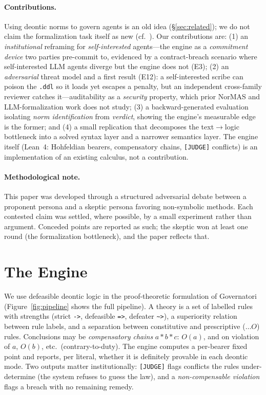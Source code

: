 \documentclass[11pt]{article}
\begin{document}
\paragraph{Contributions.}
Using deontic norms to govern agents is an old idea (\S\ref{sec:related}); we do not claim the
formalization task itself as new (cf.\ \citet{horner2025robust}). Our contributions are:
(1) an \emph{institutional} reframing for \emph{self-interested} agents---the engine as a
\emph{commitment device} two parties pre-commit to, evidenced by a contract-breach scenario where
self-interested LLM agents diverge but the engine does not (E3); (2) an \emph{adversarial}
threat model and a first result (E12): a self-interested scribe can poison the \texttt{.ddl} so it
loads yet escapes a penalty, but an independent cross-family reviewer catches it---auditability as
a \emph{security} property, which prior NorMAS and LLM-formalization work does not study;
(3) a backward-generated evaluation isolating \emph{norm identification} from \emph{verdict},
showing the engine's measurable edge is the former; and (4) a small replication that decomposes the
text$\rightarrow$logic bottleneck into a solved syntax layer and a narrower semantics layer.
The engine itself (Lean~4: Hohfeldian bearers, compensatory chains, \texttt{[JUDGE]} conflicts)
is an implementation of an existing calculus, not a contribution.

\paragraph{Methodological note.}
This paper was developed through a structured adversarial debate between a
proponent persona and a skeptic persona favoring non-symbolic methods. Each
contested claim was settled, where possible, by a small experiment rather than
argument. Conceded points are reported as such; the skeptic won at least one round
(the formalization bottleneck), and the paper reflects that.

\section{The Engine}
We use defeasible deontic logic in the proof-theoretic formulation of Governatori
(Figure~\ref{fig:pipeline} shows the full pipeline).
A theory is a set of labelled rules with strengths (strict \texttt{->}, defeasible
\texttt{=>}, defeater \texttt{\textasciitilde>}), a superiority relation between
rule labels, and a separation between constitutive and prescriptive ($\dots O$)
rules. Conclusions may be \emph{compensatory chains} $a * b * c$: $O(a)$, and on
violation of $a$, $O(b)$, etc.\ (contrary-to-duty). The engine computes a per-bearer
fixed point and reports, per literal, whether it is definitely provable in each
deontic mode. Two outputs matter institutionally: \texttt{[JUDGE]} flags conflicts
the rules under-determine (the system refuses to guess the law), and a
\emph{non-compensable violation} flags a breach with no remaining remedy.
\end{document}
